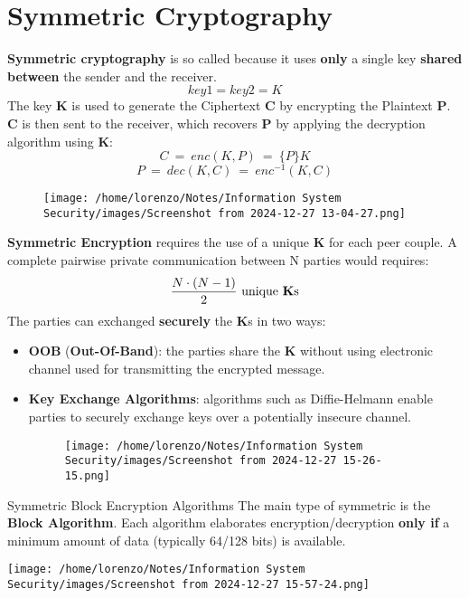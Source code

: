 \section{Symmetric Cryptography}
\textbf{Symmetric cryptography} is so called because it uses \textbf{only} a single key \textbf{shared between} the sender and the receiver. 
\[key1=key2=K\]
The key \textbf{K} is used to generate the Ciphertext \textbf{C} by encrypting the Plaintext \textbf{P}. \textbf{C} is then sent to the receiver, which recovers \textbf{P} by applying the decryption algorithm using \textbf{K}:
\[C\ =\ enc(K,P)\ =\ \{P\}K\]
\[P\ =\ dec(K,C)\ =\ enc^{-1}(K,C)\]
\begin{figure}[H]
    \centering
    \texttt{[image: /home/lorenzo/Notes/Information System Security/images/Screenshot from 2024-12-27 13-04-27.png]}
\end{figure}
\noindent
\textbf{Symmetric Encryption} requires the use of a unique \textbf{K} for each peer couple. A complete pairwise private communication between N parties would requires:
 \[\frac{N \cdot (N-1)}{2}\ \text{unique \textbf{K}s}\]
The parties can exchanged \textbf{securely} the \textbf{K}s in two ways:
\begin{itemize}
    \item \textbf{OOB} (\textbf{Out-Of-Band}): the parties share the \textbf{K} without using electronic channel used for transmitting the encrypted message.
    \item \textbf{Key Exchange Algorithms}: algorithms such as Diffie-Helmann enable parties to securely exchange keys over a potentially insecure channel.
    \begin{figure}[H]
        \centering
        \texttt{[image: /home/lorenzo/Notes/Information System Security/images/Screenshot from 2024-12-27 15-26-15.png]}
    \end{figure}   
\end{itemize}
\begin{quotebox-grey}{Symmetric Block Encryption Algorithms}
    The main type of symmetric is the \textbf{Block Algorithm}. Each algorithm elaborates encryption/decryption \textbf{only if} a minimum amount of data  (typically 64/128 bits) is available.
    \vspace{0.2cm}
        \begin{center}
            \texttt{[image: /home/lorenzo/Notes/Information System Security/images/Screenshot from 2024-12-27 15-57-24.png]}
        \end{center}
\end{quotebox-grey}


